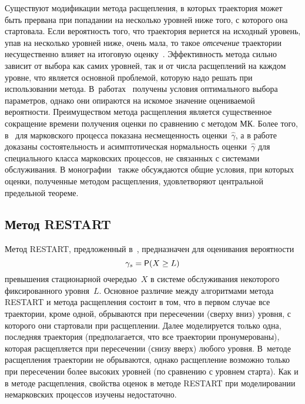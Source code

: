 \begin{multicols}{2}
Существуют модификации  метода расщепления, в которых траектория
может быть прервана при попадании на несколько уровней ниже того, с
которого она стартовала. Если вероятность того, что траектория
вернется на исходный уровень, упав на несколько уровней ниже, очень
мала, то такое \textit{отсечение} траектории несущественно влияет на
итоговую оценку~\cite{Melas, GlassHeidProc96}. Эффективность метода
сильно зависит от выбора как самих уровней,  так и от числа
расщеплений на каждом уровне, что является основной проблемой,
которую надо решать при использовании метода. 
В~работах~\cite{GlassHeid96, GlassHeidProc96, Garvels2000} получены условия
оптимального выбора па\-ра\-мет\-ров, однако они опираются на искомое
значение оцениваемой вероятности.  Преимуществом метода расщепления
является существенное сокращение времени получения оценки по
сравнению с методом МК. Более того,  в~\cite{GlassHeidProc96,
Garvels2000} для марковского процесса показана несмещенность оценки~$\hat\gamma$, 
а в работе~\cite{Cerou} доказаны состоятельность и
асимптотическая нормальность оценки~$\hat\gamma$ для специального
класса марковских процессов, не связанных с сис\-те\-ма\-ми обслуживания.
В  монографии~\cite{AG} также обсуждаются  общие условия, при
которых оценки, полученные методом расщепления,  удовлетворяют
центральной предельной теореме.

\subsection{Метод RESTART}

Метод RESTART, предложенный   в~\cite{Alt91},
предназначен  для оценивания  вероятности
\begin{equation}
\gamma_s= {\sf P} (X \ge L )
\label{gamma_s}
\end{equation}
  превышения стационарной   очередью~$X$ в системе обслуживания некоторого
фиксированного уровня~$L$.  Основное различие между алгоритмами
метода RESTART и метода расщепления состоит в том, что в первом
случае все траектории, кроме одной, обрываются при пересечении
(сверху вниз) уровня, с которого они стартовали при расщеплении.
Далее моделируется только одна, последняя траектория
(предполагается, что все траектории пронумерованы), которая
расщепляется при пересечении (снизу вверх) любого уровня. В~методе
расщепления траектории не обрываются, однако расщепление возможно
только при пересечении более высоких уровней (по сравнению с уровнем
старта).  Как и в   методе расщепления, свойства  оценок в методе
RESTART при моделировании немарковских процессов изучены
недостаточно.


\end{multicols}
